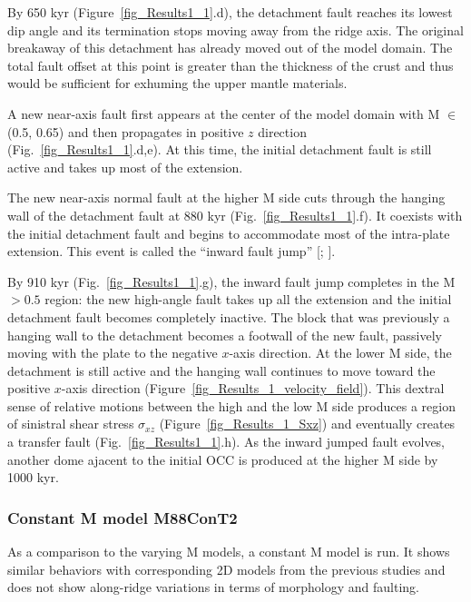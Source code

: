 \documentclass[draft,gc]{agutex}
\begin{document}
\begin{article}
By 650 kyr (Figure~\ref{fig_Results1_1}.d), the detachment fault reaches its lowest dip angle and its termination stops moving away from the ridge axis. The original breakaway of this detachment has already moved out of the model domain. The total fault offset at this point is greater than the thickness of the crust and thus would be sufficient for exhuming the upper mantle materials.

A new near-axis fault first appears at the center of the model domain with M $\in$ (0.5, 0.65) and then propagates in positive $z$ direction (Fig.~\ref{fig_Results1_1}.d,e). At this time, the initial detachment fault is still active and takes up most of the extension.

The new near-axis normal fault at the higher M side cuts through the hanging wall of the detachment fault at 880 kyr (Fig.~\ref{fig_Results1_1}.f). It coexists with the initial detachment fault and begins to accommodate most of the intra-plate extension. This event is called the ``inward fault jump'' [\citealp{Tucholke1998}; \citealp{Dick2008}].

By 910 kyr (Fig.~\ref{fig_Results1_1}.g), the inward fault jump completes in the M $> 0.5$ region: the new high-angle fault takes up all the extension and the initial detachment fault becomes completely inactive. The block that was previously a hanging wall to the detachment becomes a footwall of the new fault, passively moving with the plate to the negative $x$-axis direction. At the lower M side, the detachment is still active and the hanging wall continues to move toward the positive $x$-axis direction (Figure~\ref{fig_Results_1_velocity_field}). This dextral sense of relative motions between the high and the low M side produces a region of sinistral shear stress $\sigma_{xz}$ (Figure~\ref{fig_Results_1_Sxz}) and eventually creates a transfer fault (Fig.~\ref{fig_Results1_1}.h). As the inward jumped fault evolves, another dome ajacent to the initial OCC is produced at the higher M side by 1000 kyr.

\subsubsection{Constant M model M88ConT2}
As a comparison to the varying M models, a constant M model is run. It shows similar behaviors with corresponding 2D models from the previous studies and does not show along-ridge variations in terms of morphology and faulting.


\end{article}
\end{document}
